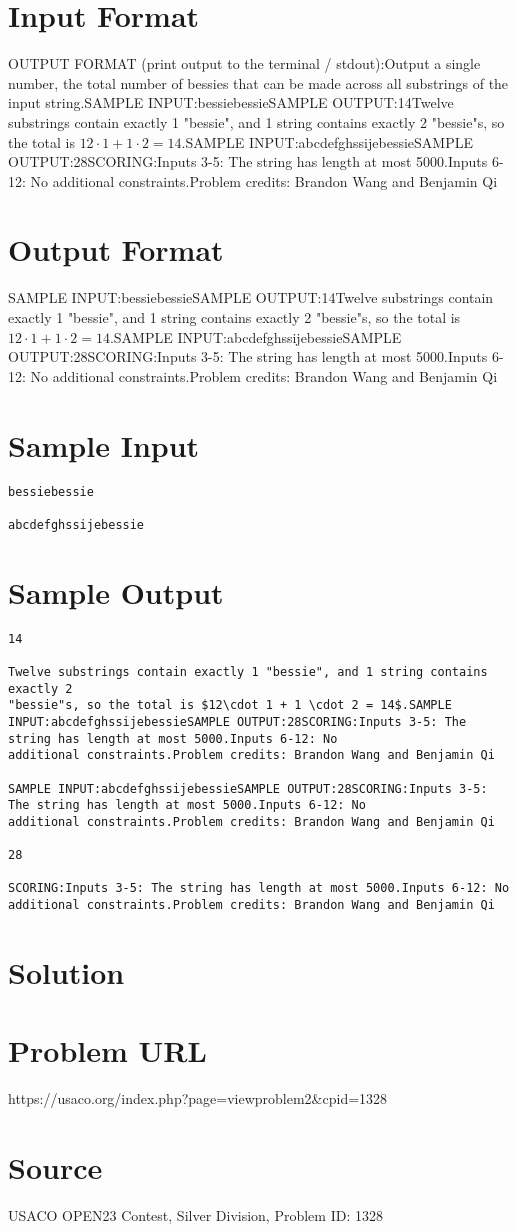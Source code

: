 \documentclass[12pt]{article}
\begin{document}
\section*{Input Format}
OUTPUT FORMAT (print output to the terminal / stdout):Output a single number, the total number of bessies that can be made across all
substrings of the input string.SAMPLE INPUT:bessiebessieSAMPLE OUTPUT:14Twelve substrings contain exactly 1 "bessie", and 1 string contains exactly 2
"bessie"s, so the total is $12\cdot 1 + 1 \cdot 2 = 14$.SAMPLE INPUT:abcdefghssijebessieSAMPLE OUTPUT:28SCORING:Inputs 3-5: The string has length at most 5000.Inputs 6-12: No
additional constraints.Problem credits: Brandon Wang and Benjamin Qi

\section*{Output Format}
SAMPLE INPUT:bessiebessieSAMPLE OUTPUT:14Twelve substrings contain exactly 1 "bessie", and 1 string contains exactly 2
"bessie"s, so the total is $12\cdot 1 + 1 \cdot 2 = 14$.SAMPLE INPUT:abcdefghssijebessieSAMPLE OUTPUT:28SCORING:Inputs 3-5: The string has length at most 5000.Inputs 6-12: No
additional constraints.Problem credits: Brandon Wang and Benjamin Qi

\section*{Sample Input}
\begin{verbatim}
bessiebessie

abcdefghssijebessie
\end{verbatim}

\section*{Sample Output}
\begin{verbatim}
14

Twelve substrings contain exactly 1 "bessie", and 1 string contains exactly 2
"bessie"s, so the total is $12\cdot 1 + 1 \cdot 2 = 14$.SAMPLE INPUT:abcdefghssijebessieSAMPLE OUTPUT:28SCORING:Inputs 3-5: The string has length at most 5000.Inputs 6-12: No
additional constraints.Problem credits: Brandon Wang and Benjamin Qi

SAMPLE INPUT:abcdefghssijebessieSAMPLE OUTPUT:28SCORING:Inputs 3-5: The string has length at most 5000.Inputs 6-12: No
additional constraints.Problem credits: Brandon Wang and Benjamin Qi

28

SCORING:Inputs 3-5: The string has length at most 5000.Inputs 6-12: No
additional constraints.Problem credits: Brandon Wang and Benjamin Qi
\end{verbatim}

\section*{Solution}


\section*{Problem URL}
https://usaco.org/index.php?page=viewproblem2&cpid=1328

\section*{Source}
USACO OPEN23 Contest, Silver Division, Problem ID: 1328
\end{document}
